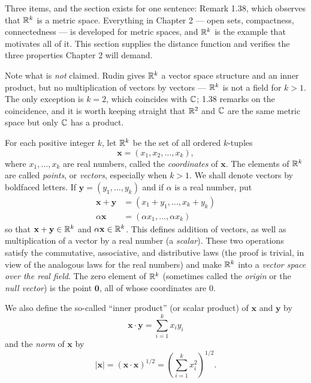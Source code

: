 
\begin{signpost}
Three items, and the section exists for one sentence: Remark 1.38, which
observes that $\mathbb{R}^k$ is a metric space. Everything in Chapter 2 --- open sets,
compactness, connectedness --- is developed for metric spaces, and $\mathbb{R}^k$ is the
example that motivates all of it. This section supplies the distance function
and verifies the three properties Chapter 2 will demand.

\smallskip
Note what is \emph{not} claimed. Rudin gives $\mathbb{R}^k$ a vector space structure and
an inner product, but no multiplication of vectors by vectors --- $\mathbb{R}^k$ is not
a field for $k > 1$. The only exception is $k = 2$, which coincides with $\mathbb{C}$;
1.38 remarks on the coincidence, and it is worth keeping straight that $\mathbb{R}^2$
and $\mathbb{C}$ are the same metric space but only $\mathbb{C}$ has a product.
\end{signpost}

For each positive integer $k$, let $\mathbb{R}^k$ be the set of all ordered $k$-tuples
\[ \mathbf{x} = (x_1, x_2, \dots, x_k), \]
where $x_1, \dots, x_k$ are real numbers, called the \emph{coordinates} of
$\mathbf{x}$. The elements of $\mathbb{R}^k$ are called \emph{points}, or
\emph{vectors}, especially when $k > 1$. We shall denote vectors by boldfaced
letters. If $\mathbf{y} = (y_1,\dots,y_k)$ and if $\alpha$ is a real number, put
\begin{align*}
  \mathbf{x}+\mathbf{y} &= (x_1+y_1, \dots, x_k+y_k)\\
  \alpha\mathbf{x} &= (\alpha x_1, \dots, \alpha x_k)
\end{align*}
so that $\mathbf{x}+\mathbf{y} \in \mathbb{R}^k$ and $\alpha\mathbf{x} \in \mathbb{R}^k$. This
defines addition of vectors, as well as multiplication of a vector by a real
number (a \emph{scalar}). These two operations satisfy the commutative,
associative, and distributive laws (the proof is trivial, in view of the
analogous laws for the real numbers) and make $\mathbb{R}^k$ into a \emph{vector space
over the real field}. The zero element of $\mathbb{R}^k$ (sometimes called the
\emph{origin} or the \emph{null vector}) is the point $\mathbf{0}$, all of whose
coordinates are $0$.

We also define the so-called ``inner product'' (or scalar product) of
$\mathbf{x}$ and $\mathbf{y}$ by
\[ \mathbf{x}\cdot\mathbf{y} = \sum_{i=1}^k x_iy_i \]
and the \emph{norm} of $\mathbf{x}$ by
\[ |\mathbf{x}| = (\mathbf{x}\cdot\mathbf{x})^{1/2}
   = \left(\sum_{i=1}^k x_i^2\right)^{1/2}. \]

